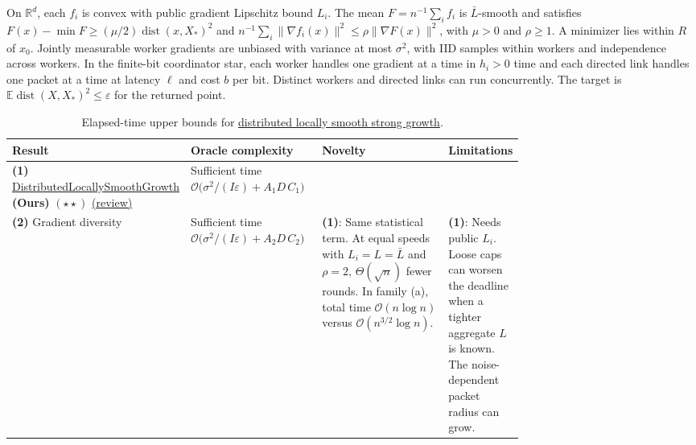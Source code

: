 \begin{table}[tp]
\centering
\caption{Elapsed-time upper bounds for \href{https://github.com/k3nfalt/longtails/blob/main/LongTails/Setups/DistributedLocallySmoothGrowth.lean}{distributed locally smooth strong growth}.}\label{tab:DistributedLocallySmoothGrowth}
\parbox{\linewidth}{\footnotesize On $\mathbb R^d$, each $f_i$ is convex with public gradient Lipschitz bound $L_i$. The mean $F=n^{-1}\sum_i f_i$ is $\bar L$-smooth and satisfies $F(x)-\min F\ge(\mu/2)\operatorname{dist}(x,X_*)^2$ and $n^{-1}\sum_i\|\nabla f_i(x)\|^2\le\rho\|\nabla F(x)\|^2$, with $\mu>0$ and $\rho\ge1$. A minimizer lies within $R$ of $x_0$. Jointly measurable worker gradients are unbiased with variance at most $\sigma^2$, with IID samples within workers and independence across workers. In the finite-bit coordinator star, each worker handles one gradient at a time in $h_i>0$ time and each directed link handles one packet at a time at latency $\ell$ and cost $b$ per bit. Distinct workers and directed links can run concurrently. The target is $\mathbb E\operatorname{dist}(X,X_*)^2\le\varepsilon$ for the returned point.}\par\smallskip
\begin{threeparttable}
\footnotesize
\setlength{\tabcolsep}{4pt}\renewcommand{\arraystretch}{1.25}
\begin{tabularx}{\linewidth}{@{}>{\raggedright\arraybackslash}p{0.21\linewidth}>{\raggedright\arraybackslash}p{0.26\linewidth}>{\raggedright\arraybackslash}p{0.27\linewidth}>{\raggedright\arraybackslash}X@{}}
\toprule
\textbf{Result} & \textbf{Oracle complexity} & \textbf{Novelty} & \textbf{Limitations} \\
\midrule
\textbf{(1)} \href{https://github.com/k3nfalt/longtails/blob/main/LongTails/Theorems/DistributedLocallySmoothGrowth.lean}{Distributed\allowbreak{}Locally\allowbreak{}Smooth\allowbreak{}Growth} \textbf{(Ours)} $(\star\star)$ \href{https://github.com/k3nfalt/longtails/blob/main/scripts/reviews/DistributedLocallySmoothGrowth.md}{(review)}
& Sufficient time $\mathcal{O}\bigl(\sigma^2/(I\varepsilon)+A_1D\,C_1\bigr)$ & & \\
\midrule[1.2pt]
\textbf{(2)} Gradient diversity \citep{dlsgGradientDiversity}
& Sufficient time $\mathcal{O}\bigl(\sigma^2/(I\varepsilon)+A_2D\,C_2\bigr)$
& \textbf{(1)}: Same statistical term. At equal speeds with $L_i=L=\bar L$ and $\rho=2$, $\Theta(\sqrt n)$ fewer rounds. In family (a), total time $\mathcal{O}(n\log n)$ versus $\mathcal{O}(n^{3/2}\log n)$.
& \textbf{(1)}: Needs public $L_i$. Loose caps can worsen the deadline when a tighter aggregate $L$ is known. The noise-dependent packet radius can grow. \\

\end{tabularx}
\end{threeparttable}
\end{table}
